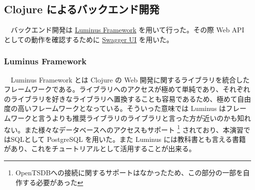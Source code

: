 \documentclass{scrartcl}
\begin{document}
\subsection{Clojure によるバックエンド開発}
\label{sec:org2d3725f}
　バックエンド開発は \href{http://www.luminusweb.net/}{Luminus Framework} を用いて行った。その際 Web API としての動作を確認するために \href{https://swagger.io/swagger-ui/}{Swagger UI} を用いた。\\
\subsubsection{Luminus Framework}
\label{sec:orge272b7d}
　Luminus Framework とは Clojure の Web 開発に関するライブラリを統合したフレームワークである。ライブラリへのアクセスが極めて単純であり、それぞれのライブラリを好きなライブラリへ置換することも容易であるため、極めて自由度の高いフレームワークとなっている。そういった意味では Luminus はフレームワークと言うよりも推奨ライブラリのライブラリと言った方が近いのかも知れない。また様々なデータベースへのアクセスもサポート \footnote{OpenTSDBへの接続に関するサポートはなかったため、この部分の一部を自作する必要があった} されており、本演習ではSQLとして PostgreSQL を用いた。また Luminus には教科書とも言える書籍 \cite{luminus} があり、これをチュートリアルとして活用することが出来る。\\
\end{document}
